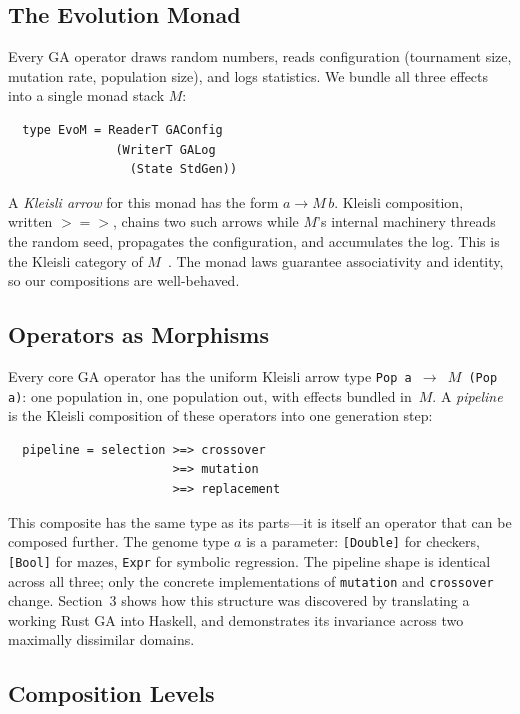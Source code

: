 \documentclass[dvipsnames,format=sigconf,anonymous=true,review=true]{acmart}
\begin{document}
\subsection{The Evolution Monad}

Every GA operator draws random numbers, reads configuration (tournament size, mutation rate, population size), and logs statistics. We bundle all three effects into a single monad stack $M$:

\begin{verbatim}
  type EvoM = ReaderT GAConfig
               (WriterT GALog
                 (State StdGen))
\end{verbatim}

\noindent A \emph{Kleisli arrow} for this monad has the form $a \to M\,b$. Kleisli composition, written $\mathbin{>\!\!=\!\!>}$, chains two such arrows while $M$'s internal machinery threads the random seed, propagates the configuration, and accumulates the log. This is the Kleisli category of $M$~\cite{maclane1971categories, moggi1991notions}. The monad laws guarantee associativity and identity, so our compositions are well-behaved.

\subsection{Operators as Morphisms}

Every core GA operator has the uniform Kleisli arrow type \texttt{Pop\,a $\to$ $M$\,(Pop\,a)}: one population in, one population out, with effects bundled in~$M$. A \emph{pipeline} is the Kleisli composition of these operators into one generation step:

\begin{verbatim}
  pipeline = selection >=> crossover
                       >=> mutation
                       >=> replacement
\end{verbatim}

\noindent This composite has the same type as its parts---it is itself an operator that can be composed further. The genome type $a$ is a parameter: \texttt{[Double]} for checkers, \texttt{[Bool]} for mazes, \texttt{Expr} for symbolic regression. The pipeline shape is identical across all three; only the concrete implementations of \texttt{mutation} and \texttt{crossover} change. Section~3 shows how this structure was discovered by translating a working Rust GA into Haskell, and demonstrates its invariance across two maximally dissimilar domains.

\subsection{Composition Levels}
\end{document}
